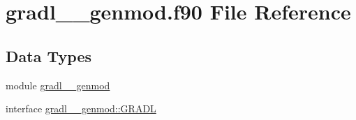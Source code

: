 \hypertarget{gradl____genmod_8f90}{\section{gradl\+\_\+\+\_\+genmod.\+f90 File Reference}
\label{gradl____genmod_8f90}
}
\subsection*{Data Types}
\begin{DoxyCompactItemize}
\item 
module \hyperlink{classgradl____genmod}{gradl\+\_\+\+\_\+genmod}
\item 
interface \hyperlink{interfacegradl____genmod_1_1GRADL}{gradl\+\_\+\+\_\+genmod\+::\+G\+R\+A\+D\+L}
\end{DoxyCompactItemize}
